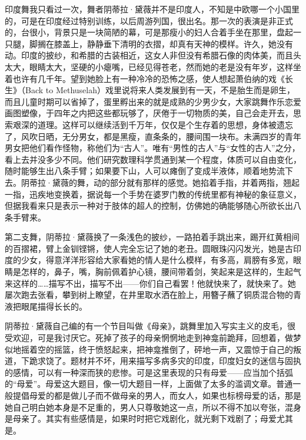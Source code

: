 \par 印度舞我只看过一次，舞者阴蒂拉·黛薇并不是印度人，不知是中欧哪一个小国里的，可是在印度经过特别训练，以后周游列国，很出名。那一次的表演是非正式的，台很小，背景只是一块简陋的幕，可是那瘦小的妇人合着手坐在那里，盘起一只腿，脚搁在膝盖上，静静垂下清明的衣摺，却真有天神的模样。许久，她没有动。印度的披纱，和希腊的古装相近，这女人非但没有希腊石像的肉体美，而且头太大，眼睛太大，坚硬的小瘪嘴，已经见得苍老，然而她的老是没有年岁，这样坐着也许有几千年。望到她脸上有一种冷冷的恐怖之感，使人想起萧伯纳的戏《长生》（Back to Methuselah）戏里说将来人类发展到有一天，不是胎生而是卵生，而且儿童时期可以省掉了，蛋里孵出来的就是成熟的少男少女，大家跳舞作乐恋爱画图塑像，于四年之内把这些都玩够了，厌倦于一切物质的美，自己会走开去，思索艰深的道理。这样可以继续活到千万年，仅仅是个生存着的思想，身体被遗忘了，风吹日晒，无分男女，都是黑瘦，直条条的，腰间围一块布。未满四岁的青年男女把他们看作怪物，称他们为“古人”。唯有“男性的古人”与“女性的古人”之分，看上去并没多少不同。他们研究数理科学贯通到某一个程度，体质可以自由变化，随时能够生出八条手臂；如果要下山，人可以瘫倒了变成半液体，顺着地势流下去。阴蒂拉·黛薇的舞，动的部分就有那样的感觉。她掐着手指，并着两指，翘起一指，迅疾地变换着，据说每一个手势在婆罗门教的传统里都有神秘的象征意义，但据我看来只是表示一种对于肢体的超人的控制，仿佛她的确能够随心所欲长出八条手臂来。
\par 第二支舞，阴蒂拉·黛薇换了一条浅色的披纱，一路拍着手跳出来，踢开红黄相间的百摺裙，臂上金钏铿锵，使人完全忘记了她的老丑。圆眼珠闪闪发光，她是古印度的少女，得意洋洋形容给大家看她的情人是什么模样，有多高，肩膀有多宽，眼睛是怎样的，鼻子，嘴，胸前佩着护心镜，腰间带着剑，笑起来是这样的，生起气来这样的……描写不出，描写不出——你们自己看罢！他就快来了，就快来了。她屡次跑去张看，攀到树上瞭望，在井里取水洒在脸上，用簪子蘸了铜质混合物的青液把眼尾描得长长的。
\par 阴蒂拉·黛薇自己编的有一个节目叫做《母亲》，跳舞里加入写实主义的皮毛，很受欢迎，可是我讨厌它。死掉了孩子的母亲惘惘地走到神龛前跪拜，回想着，做梦似地摇着空的摇篮，终于愤怒起来，把神龛推倒了，砰地一声，又震惊于自己的叛道，下跪求饶了。题材并不坏，用来描写多病多灾的印度，印度妇女的迷信与固执的感情，可以有一种深而狭的悲惨。可是这里表现的只有母爱——应当加个括弧的“母爱”。母爱这大题目，像一切大题目一样，上面做了太多的滥调文章。普通一般提倡母爱的都是做儿子而不做母亲的男人，而女人，如果也标榜母爱的话，那是她自己明白她本身是不足重的，男人只尊敬她这一点，所以不得不加以夸张，混身是母亲了。其实有些感情是，如果时时把它戏剧化，就光剩下戏剧了；母爱尤其是。
